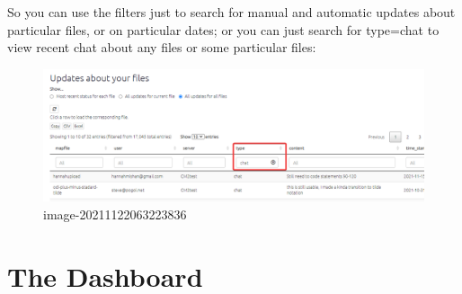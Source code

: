 \documentclass[
]{book}
\begin{document}
So you can use the filters just to search for manual and automatic updates about particular files, or on particular dates; or you can just search for type=chat to view recent chat about any files or some particular files:

\begin{figure}
\centering
\includegraphics{_assets/image-20211122063223836.png}
\caption{image-20211122063223836}
\end{figure}

\hypertarget{dashboard}{%
\chapter{The Dashboard}\label{dashboard}}
\end{document}
